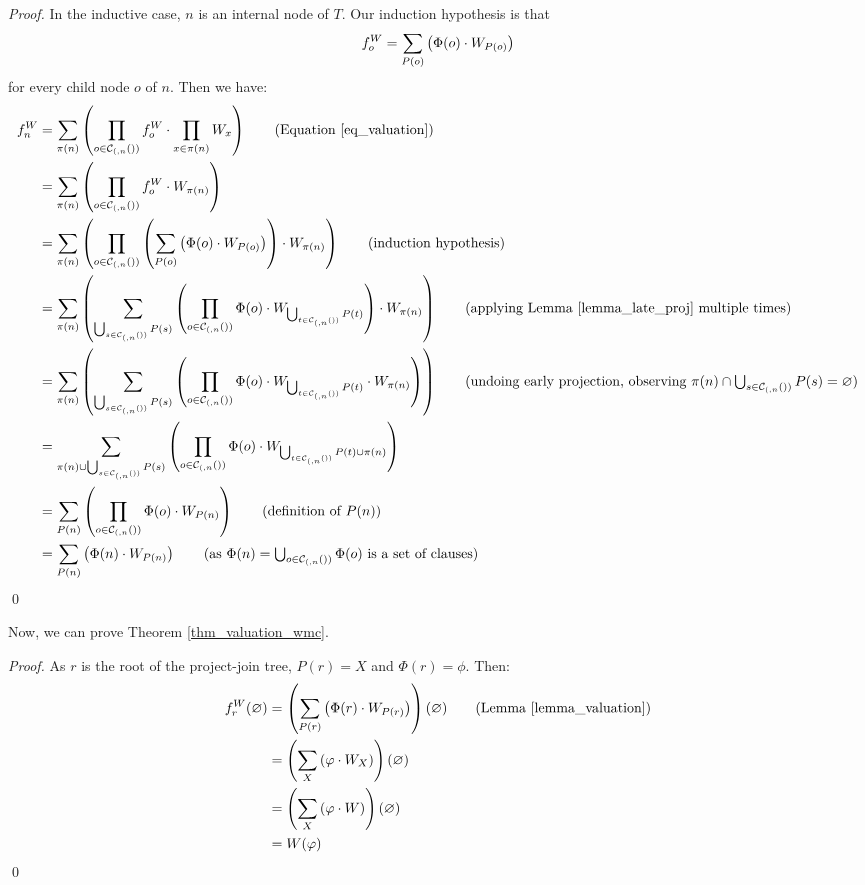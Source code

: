 \begin{proof}
    In the inductive case, $n$ is an internal node of $T$.
    Our induction hypothesis is that
    $$f^W_o = \sum_{P(o)} \left(  \Phi(o) \cdot W_{P(o)}  \right)$$
    for every child node $o$ of $n$.
    Then we have:
    \begin{align*}
        f^W_n
        & = \proj_{\pi(n)} \pars{\prod_{o \in \C(n)} f^W_o \mult \prod_{x \in \pi(n)} W_x} \tag{Equation \eqref{eq_valuation}} \\
        & = \proj_{\pi(n)} \pars{\prod_{o \in \C(n)} f^W_o \mult W_{\pi(n)}} \\
        & = \proj_{\pi(n)} \pars{\prod_{o \in \C(n)} \pars{\proj_{P(o)} \pars{ \Phi(o) \mult W_{P(o)} } } \mult W_{\pi(n)}} \tag{induction hypothesis} \\
        & = \proj_{\pi(n)} \pars{ \proj_{\bigcup_{s \in \C(n)} P(s)} \pars{ \prod_{o \in \C(n)} \Phi(o) \mult W_{\bigcup_{t \in \C(n)} P(t)} } \mult W_{\pi(n)} } \tag{applying Lemma \ref{lemma_late_proj} multiple times} \\
        & = \proj_{\pi(n)} \pars{ \proj_{\bigcup_{s \in \C(n)} P(s)} \pars{ \prod_{o \in \C(n)} \Phi(o) \mult W_{\bigcup_{t \in \C(n)} P(t)} \mult W_{\pi(n)}} } \tag{undoing early projection, observing $\pi(n) \cap \bigcup_{s \in \C(n)} P(s) = \emptyset$} \\
        & = \proj_{\pi(n) \cup \bigcup_{s \in \C(n)} P(s)} \pars{ \prod_{o \in \C(n)} \Phi(o) \mult W_{\bigcup_{t \in \C(n)} P(t) \cup \pi(n)} } \\
        & = \proj_{P(n)} \pars{ \prod_{o \in \C(n)} \Phi(o) \mult W_{P(n)} } \tag{definition of $P(n)$} \\
        & = \proj_{P(n)} \pars{ \Phi(n) \mult W_{P(n)} } \tag{as $\Phi(n) = \bigcup_{o \in \C(n)} \Phi(o)$ is a set of clauses}
    \end{align*}
\qed
\end{proof}

Now, we can prove Theorem \ref{thm_valuation_wmc}.
\begin{proof}
    As $r$ is the root of the project-join tree, $P(r) = X$ and $\Phi(r) = \phi$.
    Then:
    \begin{align*}
        f^W_r(\emptyset)
        & = \pars{ \proj_{P(r)} \pars{ \Phi(r) \mult W_{P(r)} } } (\emptyset) \tag{Lemma \ref{lemma_valuation}} \\
        & = \pars{ \proj_{X} \pars{ \phi \mult W_{X} } } (\emptyset) \\
        & = \pars{ \proj_{X} \pars{ \phi \mult W } } (\emptyset) \\
        & = W(\phi)
    \end{align*}
\qed
\end{proof}

